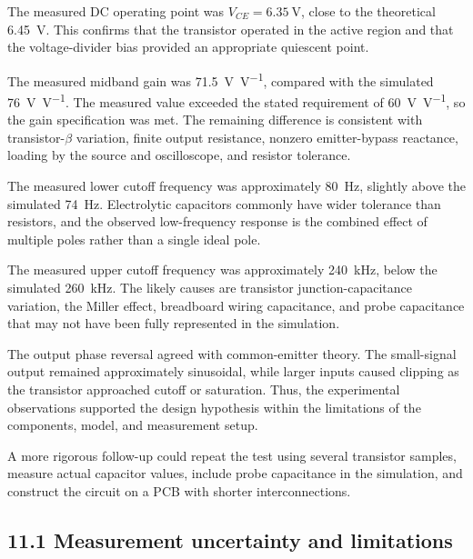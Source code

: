 \documentclass[11pt,a4paper]{article}
\begin{document}
\begin{examplebox}
The measured DC operating point was
$V_{CE}=\SI{6.35}{\volt}$, close to the theoretical
\SI{6.45}{\volt}. This confirms that the transistor operated in the active
region and that the voltage-divider bias provided an appropriate quiescent
point.

The measured midband gain was
\SI{71.5}{\volt\per\volt}, compared with the simulated
\SI{76}{\volt\per\volt}. The measured value exceeded the stated requirement
of \SI{60}{\volt\per\volt}, so the gain specification was met. The remaining
difference is consistent with transistor-$\beta$ variation, finite output
resistance, nonzero emitter-bypass reactance, loading by the source and
oscilloscope, and resistor tolerance.

The measured lower cutoff frequency was approximately
\SI{80}{\hertz}, slightly above the simulated
\SI{74}{\hertz}. Electrolytic capacitors commonly have wider tolerance than
resistors, and the observed low-frequency response is the combined effect of
multiple poles rather than a single ideal pole.

The measured upper cutoff frequency was approximately
\SI{240}{\kilo\hertz}, below the simulated
\SI{260}{\kilo\hertz}. The likely causes are transistor junction-capacitance
variation, the Miller effect, breadboard wiring capacitance, and probe
capacitance that may not have been fully represented in the simulation.

The output phase reversal agreed with common-emitter theory. The small-signal
output remained approximately sinusoidal, while larger inputs caused
clipping as the transistor approached cutoff or saturation. Thus, the
experimental observations supported the design hypothesis within the
limitations of the components, model, and measurement setup.

A more rigorous follow-up could repeat the test using several transistor
samples, measure actual capacitor values, include probe capacitance in the
simulation, and construct the circuit on a PCB with shorter interconnections.
\end{examplebox}

\subsection*{11.1 Measurement uncertainty and limitations}
\end{document}
